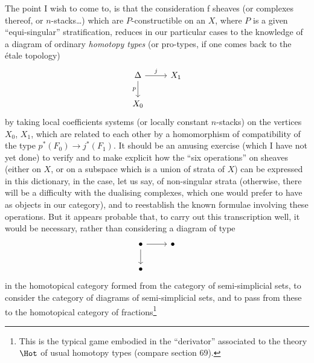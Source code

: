 \label{sec:app17}%
The point I wish to come to, is that the consideration f sheaves (or complexes thereof, or $n$-stacks\dots) which are $P$-constructible on an $X$, where $P$ is a given ``equi-singular'' stratification, reduces in our particular cases to the knowledge of a diagram of ordinary \emph{homotopy types} (or pro-types, if one comes back to the étale topology)
\[\begin{tikzcd}
  \Delta \ar[r,"j"]\ar[d,swap,"p"] & X_1 \\
  X_0 &
\end{tikzcd}\]
by taking local coefficients systems (or locally constant $n$-stacks) on the vertices $X_0$, $X_1$, which are related to each other by a homomorphism of compatibility of the type $p^*(F_0) \to j^*(F_1)$. It should be an amusing exercise (which I have not yet done) to verify and to make explicit how the ``six operations'' on sheaves (either on $X$, or on a subspace which is a union of strata of $X$) can be expressed in this dictionary, in the case, let us say, of non-singular strata (otherwise, there will be a difficulty with the dualising complexes, which one would prefer to have as objects in our category), and to reestablish the known formulae involving these operations. But it appears probable that, to carry out this transcription well, it would be necessary, rather than considering a diagram of type
\[\begin{tikzcd}
  \bullet \ar[r]\ar[d] & \bullet \\
  \bullet &
\end{tikzcd}\]
in the homotopical category formed from the category of semi-simplicial sets, to consider the category of diagrams of semi-simplicial sets, and to pass from these to the homotopical category of fractions\footnote{This is the typical game embodied in the ``derivator'' associated to the theory $\Hot$ of usual homotopy types (compare section 69).}

